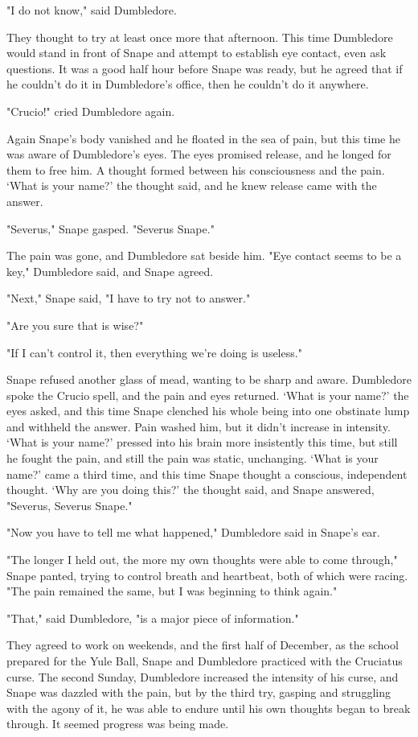 "I do not know," said Dumbledore.

They thought to try at least once more that afternoon. This time Dumbledore would stand in front of Snape and attempt to establish eye contact, even ask questions. It was a good half hour before Snape was ready, but he agreed that if he couldn't do it in Dumbledore's office, then he couldn't do it anywhere.

"Crucio!" cried Dumbledore again.

Again Snape's body vanished and he floated in the sea of pain, but this time he was aware of Dumbledore's eyes. The eyes promised release, and he longed for them to free him. A thought formed between his consciousness and the pain. `What is your name?' the thought said, and he knew release came with the answer.

"Severus," Snape gasped. "Severus Snape."

The pain was gone, and Dumbledore sat beside him. "Eye contact seems to be a key," Dumbledore said, and Snape agreed.

"Next," Snape said, "I have to try not to answer."

"Are you sure that is wise?"

"If I can't control it, then everything we're doing is useless."

Snape refused another glass of mead, wanting to be sharp and aware. Dumbledore spoke the Crucio spell, and the pain and eyes returned. `What is your name?' the eyes asked, and this time Snape clenched his whole being into one obstinate lump and withheld the answer. Pain washed him, but it didn't increase in intensity. `What is your name?' pressed into his brain more insistently this time, but still he fought the pain, and still the pain was static, unchanging. `What is your name?' came a third time, and this time Snape thought a conscious, independent thought. `Why are you doing this?' the thought said, and Snape answered, "Severus, Severus Snape."

"Now you have to tell me what happened," Dumbledore said in Snape's ear.

"The longer I held out, the more my own thoughts were able to come through," Snape panted, trying to control breath and heartbeat, both of which were racing. "The pain remained the same, but I was beginning to think again."

"That," said Dumbledore, "is a major piece of information."

They agreed to work on weekends, and the first half of December, as the school prepared for the Yule Ball, Snape and Dumbledore practiced with the Cruciatus curse. The second Sunday, Dumbledore increased the intensity of his curse, and Snape was dazzled with the pain, but by the third try, gasping and struggling with the agony of it, he was able to endure until his own thoughts began to break through. It seemed progress was being made.

